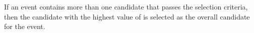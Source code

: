 If an event contains more than one \ZZ candidate that passes the selection criteria, then the candidate with the highest value of \Dkinbkg is selected as the overall \ZZ candidate for the event.



